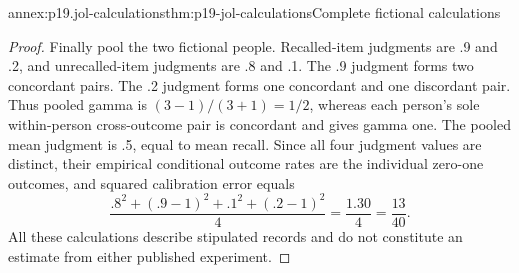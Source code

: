 \begin{annexitem}{annex:p19.jol-calculations}{thm:p19-jol-calculations}{Complete fictional calculations}
\begin{proof}
Finally pool the two fictional people. Recalled-item judgments
are .9 and .2, and unrecalled-item judgments are .8 and .1.
The .9 judgment forms two concordant pairs. The .2 judgment
forms one concordant and one discordant pair. Thus pooled
gamma is \((3-1)/(3+1)=1/2\), whereas each person's sole
within-person cross-outcome pair is concordant and gives
gamma one. The pooled mean judgment is .5, equal to mean
recall. Since all four judgment values are distinct, their
empirical conditional outcome rates are the individual
zero-one outcomes, and squared calibration error equals
\[
\frac{.8^2+(.9-1)^2+.1^2+(.2-1)^2}{4}
=\frac{1.30}{4}=\frac{13}{40}.
\]
All these calculations describe stipulated records and do
not constitute an estimate from either published experiment.
\end{proof}
\end{annexitem}
